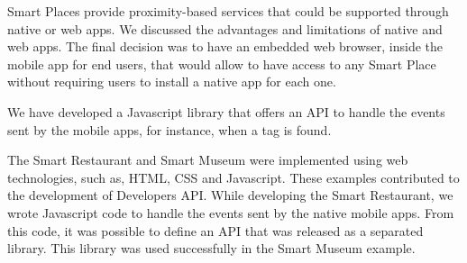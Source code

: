 Smart Places provide proximity-based services that could be supported through native or web apps.
We discussed the advantages and limitations of native and web apps.
The final decision was to have an embedded web browser, inside the mobile app for end users, that would allow to have access to any Smart Place without requiring users to install a native app for each one.

We have developed a Javascript library that offers an \gls{API} to handle the events sent by the mobile apps, for instance, when a tag is found.

The Smart Restaurant and Smart Museum were implemented using web technologies, such as, \gls{HTML}, \gls{CSS} and Javascript.
These examples contributed to the development of Developers \gls{API}.
While developing the Smart Restaurant, we wrote Javascript code to handle the events sent by the native mobile apps.
From this code, it was possible to define an \gls{API} that was released as a separated library.
This library was used successfully in the Smart Museum example.
